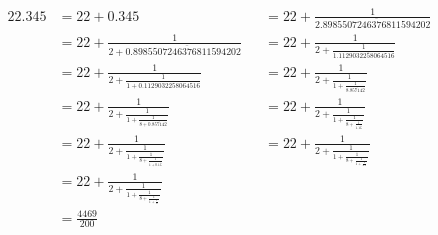 \documentclass[crop,border=1,convert=pdf2svg]{standalone}
\begin{document}
$\displaystyle
\begin{aligned}
  22.345 &=     22 + 0.345
           & &= 22 + \frac{1}{2.\overline{8985507246376811594202}} \\
         &=     22 + \frac{1}{2+0.\overline{8985507246376811594202}}
           & &= 22 + \frac{1}{2 + \frac{1}{1.1\overline{129032258064516}}} \\
         &=     22 + \frac{1}{2 + \frac{1}{1 + 0.1\overline{129032258064516}}}
           & &= 22 + \frac{1}{2 + \frac{1}{1 + \frac{1}{8.\overline{857142}}}} \\
         &=     22 + \frac{1}{2 + \frac{1}{1 + \frac{1}{8+0.\overline{857142}}}}
           & &= 22 + \frac{1}{2 + \frac{1}{1 + \frac{1}{8+\frac{1}{1.1\overline{6}}}}} \\
         &=     22 + \frac{1}{2 + \frac{1}{1 + \frac{1}{8+\frac{1}{1 + 0.1\overline{6}}}}}
           & &= 22 + \frac{1}{2 + \frac{1}{1 + \frac{1}{8+\frac{1}{1 + \frac{1}{6.0}}}}} \\
         &=     22 + \frac{1}{2 + \frac{1}{1 + \frac{1}{8+\frac{1}{1 + \frac{1}{6}}}}}
           & &    \\
         &=     \frac{4469}{200}
  & &
\end{aligned}$
\end{document}
